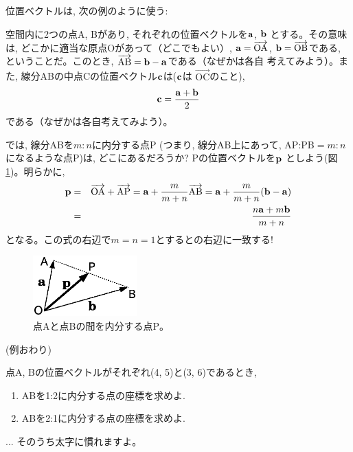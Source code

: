 位置ベクトルは, 次の例のように使う:

\begin{exmpl} 空間内に2つの点A, Bがあり, それぞれの位置ベクトルを${\bf a}$, ${\bf b}$
とする。その意味は, どこかに適当な原点Oがあって（どこでもよい）, ${\bf a}=\overrightarrow{\text{OA}}$, 
${\bf b}=\overrightarrow{\text{OB}}$である, ということだ。このとき, 
$\overrightarrow{\text{AB}}={\bf b}-{\bf a}$である（なぜかは各自
考えてみよう）。また, 線分ABの中点Cの位置ベクトル${\bf c}$は(${\bf c}$は
$\overrightarrow{\text{OC}}$のこと), 
\begin{eqnarray}
{\bf c}=\frac{{\bf a}+{\bf b}}{2}\label{eq:vect_middlepoint}
\end{eqnarray}
である（なぜかは各自考えてみよう）。

では, 線分ABを$m:n$に内分する点P (つまり, 線分AB上にあって, 
AP:PB$=m:n$になるような点P)は, どこにあるだろうか? Pの位置ベクトルを$\bf p$
としよう(図\ref{fig:vector_3})。明らかに, 
\begin{eqnarray}
{\bf p}&=&\overrightarrow{\text{OA}}+\overrightarrow{\text{AP}}={\bf a} + \frac{m}{m+n}\overrightarrow{\text{AB}}={\bf a} + \frac{m}{m+n}({\bf b}-{\bf a})\nonumber\\
&=&\frac{n {\bf a} + m {\bf b}}{m+n}\label{eq:vect_naibun}
\end{eqnarray}
となる。この式の右辺で$m=n=1$とするとの右辺に一致する!
\begin{figure}[h]
    \centering
    \includegraphics[width=4cm]{vector_3.eps}
    \caption{点Aと点Bの間を内分する点P。\label{fig:vector_3}}
\end{figure}
(例おわり)\end{exmpl}

\begin{q}\label{q:vect_pos2D} 点A, Bの位置ベクトルがそれぞれ(4, 5)と(3, 6)であるとき, 
\begin{enumerate}
\item ABを1:2に内分する点の座標を求めよ.
\item ABを2:1に内分する点の座標を求めよ.
\end{enumerate}\end{q}\mv


\begin{faq}{\small{}
... そのうち太字に慣れますよ。}\end{faq}

